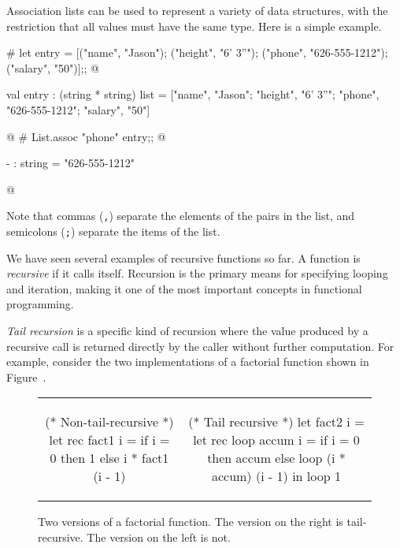 Association lists can be used to represent a variety of data
structures, with the restriction that all values must have the same
type.  Here is a simple example.

\begin{ocaml}
# let entry =
     [("name", "Jason");
      ("height", "6' 3''");
      ("phone", "626-555-1212");
      ("salary", "50")];;
@
\begin{topoutput}
val entry : (string * string) list =
  ["name", "Jason"; "height", "6' 3''";
   "phone", "626-555-1212"; "salary", "50"]
\end{topoutput}
@
# List.assoc "phone" entry;;
@
\begin{topoutput}
- : string = "626-555-1212"
\end{topoutput}
@
\end{ocaml}
%
Note that commas (\hbox{\lstinline/,/}) separate the elements of the pairs in the list,
and semicolons (\hbox{\lstinline/;/}) separate the items of the list.


We have seen several examples of recursive functions so far.  A
function is \emph{recursive} if it calls itself.  Recursion is the
primary means for specifying looping and iteration, making it one of
the most important concepts in functional programming.

\emph{Tail recursion}
is a specific kind of recursion where the value produced by a
recursive call is returned directly by the caller without further
computation.  For example, consider the two implementations of a
factorial function shown in Figure~.

\begin{figure}
\begin{center}
\begin{tabular}{cc}
\begin{minipage}[t]{2in}
\begin{ocamllisting}
(* Non-tail-recursive *)
let rec fact1 i =
   if i = 0 then
      1
   else
      i * fact1 (i - 1)
\end{ocamllisting}
\end{minipage}
&
\begin{minipage}[t]{2in}
\begin{ocamllisting}
(* Tail recursive *)
let fact2 i =
   let rec loop accum i =
      if i = 0 then
         accum
      else
         loop (i * accum) (i - 1)
   in
      loop 1
\end{ocamllisting}
\end{minipage}
\end{tabular}
\end{center}
\caption{Two versions of a factorial function.  The version on the right is tail-recursive.  The version on the left is not.}
\label{figure:factorial-recursive}
\end{figure}

